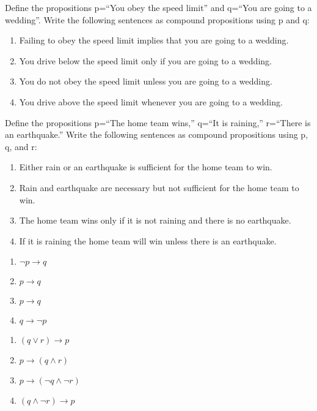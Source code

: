 \documentclass[solution, letterpaper]{cs20}
\begin{document}


\subproblem Define the propositions p=``You obey the speed limit'' and q=``You are going to a wedding''. Write the following sentences as compound propositions using p and q: 
\begin{enumerate}
\item Failing to obey the speed limit implies that you are going to a wedding.
\item You drive below the speed limit only if you are going to a wedding. 
\item You do not obey the speed limit unless you are going to a wedding. 
\item You drive above the speed limit whenever you are going to a wedding. 
\end{enumerate}

\subproblem Define the propositions p=``The home team wins,'' q=``It is raining,'' r=``There is an earthquake.'' Write the following sentences as compound propositions using p, q, and r:
\begin{enumerate}
\item Either rain or an earthquake is sufficient for the home team to win. 
\item Rain and earthquake are necessary but not sufficient for the home team to win. 
\item The home team wins only if it is not raining and there is no earthquake.
\item If it is raining the home team will win unless there is an earthquake.  
\end{enumerate}

\begin{solution}

\subsolution
\begin{enumerate}
\item $\neg p \to q$
\item $p \to q$
\item $p \to q$
\item $q \to \neg p$
\end{enumerate}

\subsolution
\begin{enumerate}
\item $(q \lor r) \to p$
\item $p \to (q \land r)$
\item $p \to (\neg q \land \neg r)$
\item $(q \land \neg r) \to p$
\end{enumerate}

\end{solution}
\end{document}

